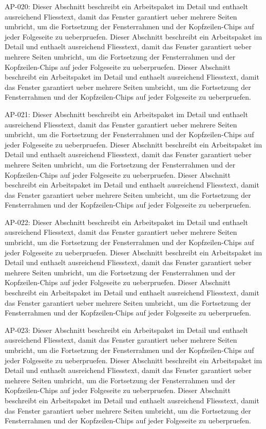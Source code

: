 \documentclass[type=report,theme=light,language=de]{semio}
\begin{document}
\begin{Table}[title=Lange Tabelle]
AP-020: Dieser Abschnitt beschreibt ein Arbeitspaket im Detail und enthaelt ausreichend Fliesstext, damit das Fenster garantiert ueber mehrere Seiten umbricht, um die Fortsetzung der Fensterrahmen und der Kopfzeilen-Chips auf jeder Folgeseite zu ueberpruefen. Dieser Abschnitt beschreibt ein Arbeitspaket im Detail und enthaelt ausreichend Fliesstext, damit das Fenster garantiert ueber mehrere Seiten umbricht, um die Fortsetzung der Fensterrahmen und der Kopfzeilen-Chips auf jeder Folgeseite zu ueberpruefen. Dieser Abschnitt beschreibt ein Arbeitspaket im Detail und enthaelt ausreichend Fliesstext, damit das Fenster garantiert ueber mehrere Seiten umbricht, um die Fortsetzung der Fensterrahmen und der Kopfzeilen-Chips auf jeder Folgeseite zu ueberpruefen. 

AP-021: Dieser Abschnitt beschreibt ein Arbeitspaket im Detail und enthaelt ausreichend Fliesstext, damit das Fenster garantiert ueber mehrere Seiten umbricht, um die Fortsetzung der Fensterrahmen und der Kopfzeilen-Chips auf jeder Folgeseite zu ueberpruefen. Dieser Abschnitt beschreibt ein Arbeitspaket im Detail und enthaelt ausreichend Fliesstext, damit das Fenster garantiert ueber mehrere Seiten umbricht, um die Fortsetzung der Fensterrahmen und der Kopfzeilen-Chips auf jeder Folgeseite zu ueberpruefen. Dieser Abschnitt beschreibt ein Arbeitspaket im Detail und enthaelt ausreichend Fliesstext, damit das Fenster garantiert ueber mehrere Seiten umbricht, um die Fortsetzung der Fensterrahmen und der Kopfzeilen-Chips auf jeder Folgeseite zu ueberpruefen. 

AP-022: Dieser Abschnitt beschreibt ein Arbeitspaket im Detail und enthaelt ausreichend Fliesstext, damit das Fenster garantiert ueber mehrere Seiten umbricht, um die Fortsetzung der Fensterrahmen und der Kopfzeilen-Chips auf jeder Folgeseite zu ueberpruefen. Dieser Abschnitt beschreibt ein Arbeitspaket im Detail und enthaelt ausreichend Fliesstext, damit das Fenster garantiert ueber mehrere Seiten umbricht, um die Fortsetzung der Fensterrahmen und der Kopfzeilen-Chips auf jeder Folgeseite zu ueberpruefen. Dieser Abschnitt beschreibt ein Arbeitspaket im Detail und enthaelt ausreichend Fliesstext, damit das Fenster garantiert ueber mehrere Seiten umbricht, um die Fortsetzung der Fensterrahmen und der Kopfzeilen-Chips auf jeder Folgeseite zu ueberpruefen. 

AP-023: Dieser Abschnitt beschreibt ein Arbeitspaket im Detail und enthaelt ausreichend Fliesstext, damit das Fenster garantiert ueber mehrere Seiten umbricht, um die Fortsetzung der Fensterrahmen und der Kopfzeilen-Chips auf jeder Folgeseite zu ueberpruefen. Dieser Abschnitt beschreibt ein Arbeitspaket im Detail und enthaelt ausreichend Fliesstext, damit das Fenster garantiert ueber mehrere Seiten umbricht, um die Fortsetzung der Fensterrahmen und der Kopfzeilen-Chips auf jeder Folgeseite zu ueberpruefen. Dieser Abschnitt beschreibt ein Arbeitspaket im Detail und enthaelt ausreichend Fliesstext, damit das Fenster garantiert ueber mehrere Seiten umbricht, um die Fortsetzung der Fensterrahmen und der Kopfzeilen-Chips auf jeder Folgeseite zu ueberpruefen. 


\end{Table}
\end{document}
